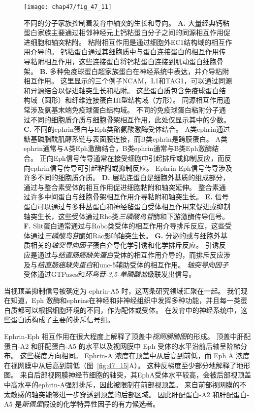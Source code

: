 \begin{figure}[htbp]
	\centering
	\texttt{[image: chap47/fig\_47\_11]}
	\caption{不同的分子家族控制着发育中轴突的生长和导向。
		\textbf{A.} 大量经典钙粘蛋白家族主要通过相邻神经元上钙粘蛋白分子之间的同源相互作用促进细胞和轴突粘附。
		粘附相互作用是通过细胞外EC1结构域的相互作用介导的。
		钙粘蛋白通过其细胞质中与蛋白连接蛋白的相互作用传导粘附相互作用，这些连接蛋白将钙粘蛋白连接到肌动蛋白细胞骨架。
		\textbf{B.} 多种免疫球蛋白超家族蛋白在神经系统中表达，并介导粘附相互作用。
		这里显示的三个例子NCAM，L1和TAG1，可以通过同源和异源结合以促进轴突生长和粘附。
		这些蛋白质包含免疫球蛋白结构域（圆形）和纤维连接蛋白III型结构域（方形）。
		同源相互作用通常涉及氨基末端免疫球蛋白结构域。
		不同的免疫球蛋白粘附分子通过不同的细胞质介质与细胞骨架相互作用，此处仅显示其中的少数。
		\textbf{C.} 不同的ephrin蛋白与Eph类酪氨酸激酶受体结合。
		A类ephrin通过糖基磷脂酰肌醇系链与表面膜连接，而B类ephrin是跨膜蛋白。
		A类ephrin通常与A类Eph激酶结合，B类ephrin通常与B类Eph激酶结合。
		正向Eph信号传导通常在接受细胞中引起排斥或抑制反应，而反向ephrin信号传导可引起粘附或抑制反应。
		Ephrin-Eph信号传导涉及许多不同的细胞质介质。
		\textbf{D.} 层粘连蛋白是细胞外基质的组成部分，通过与整合素受体的相互作用促进细胞粘附和轴突延伸。
		整合素通过许多中间蛋白与细胞骨架相互作用介导粘附和轴突生长。
		\textbf{E.} 信号蛋白可以通过与多种丛蛋白和神经毡蛋白受体相互作用来促进或抑制轴突生长，这些受体通过Rho类\textit{三磷酸鸟苷}酶和下游激酶传导信号。
		\textbf{F.} Slit蛋白通常通过与Robo类受体的相互作用介导排斥反应，这些受体通过\textit{三磷酸鸟苷}酶如Rac影响轴突生长。
		\textbf{G.} 分泌的或与细胞外基质相关的\textit{轴突导向因子}蛋白介导化学引诱和化学排斥反应。
		引诱反应是通过与\textit{结直肠癌缺失蛋白}受体的相互作用介导的，而排斥反应涉及与\textit{结直肠癌缺失蛋白}和unc-5辅助受体的相互作用。
		\textit{轴突导向因子}受体通过GTPases和\textit{环鸟苷-3,5-单磷酸盐}级联发出信号。}
	\label{fig:47_11}
\end{figure}


当视顶盖抑制信号被确定为 ephrin-A5 时，这两条研究领域汇聚在一起。
我们现在知道，Eph 激酶和ephrins在神经和非神经组织中发挥多种功能，并且每一类蛋白质都可以根据细胞环境的不同，作为配体或受体。
在发育中的神经系统中，这些蛋白质构成了主要的排斥信号组。


Ephrin-Eph 相互作用在很大程度上解释了顶盖中\textit{视网膜脑图}的形成。
顶盖中肝配蛋白-A2 和肝配蛋白-A5 的水平以及视网膜中 Eph 受体的水平沿前后轴呈阶梯分布。
这些梯度方向相同。
Ephrin-A 浓度在顶盖中从后高到前低，而 Eph A 浓度在视网膜中从后高到前低（图~\ref{fig:47_15}A）。
这种反梯度至少部分地解释了地形图。
来自后部视网膜神经节细胞的轴突，其EphA受体水平较高，会被后部视顶盖中高水平的ephrin-A强烈排斥，因此被限制在前部视顶盖。
来自前部视网膜的不太敏感的轴突能够进一步穿透到顶盖的后部区域。
因此肝配蛋白-A2 和肝配蛋白-A5 是\textit{斯佩里}假设的化学特异性因子的有力候选者。


